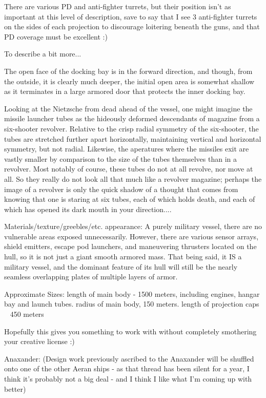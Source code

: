 There are various PD and anti-fighter turrets, but their position isn't as important at this level of description, save to say that I see 3 anti-fighter turrets on the sides of each projection to discourage loitering beneath the guns, and that PD coverage must be excellent :)

To describe a bit more...

The open face of the docking bay is in the forward direction, and though, from the outside, it is clearly much deeper, the initial open area is somewhat shallow as it terminates in a large armored door that protects the inner docking bay.

Looking at the Nietzsche from dead ahead of the vessel, one might imagine the missile launcher tubes as the hideously deformed descendants of magazine from a six-shooter revolver. Relative to the crisp radial symmetry of the six-shooter, the tubes are stretched further apart horizontally, maintaining vertical and horizontal symmetry, but not radial. Likewise, the aperatures where the missiles exit are vastly smaller by comparison to the size of the tubes themselves than in a revolver. Most notably of course, these tubes do not at all revolve, nor move at all. So they really do not look all that much like a revolver magazine; perhaps the image of a revolver is only the quick shadow of a thought that comes from knowing that one is staring at six tubes, each of which holds death, and each of which has opened its dark mouth in your direction....


Materials/texture/greebles/etc. appearance: A purely military vessel, there are no vulnerable areas exposed unnecessarily.  However, there are various sensor arrays, shield emitters, escape pod launchers, and maneuvering thrusters located on the hull, so it is not just a giant smooth armored mass. That being said, it IS a military vessel, and the dominant feature of its hull will still be the nearly seamless overlapping plates of multiple layers of armor.

Approximate Sizes: length of main body - 1500 meters, including engines, hangar bay and launch tubes.  radius of main body, 150 meters.  length of projection caps ~ 450 meters

Hopefully this gives you something to work with without completely smothering your creative license :)

Anaxander:
(Design work previously ascribed to the Anaxander will be shuffled onto one of the other Aeran ships - as that thread has been silent for a year, I think it's probably not a big deal - and I think I like what I'm coming up with better)

